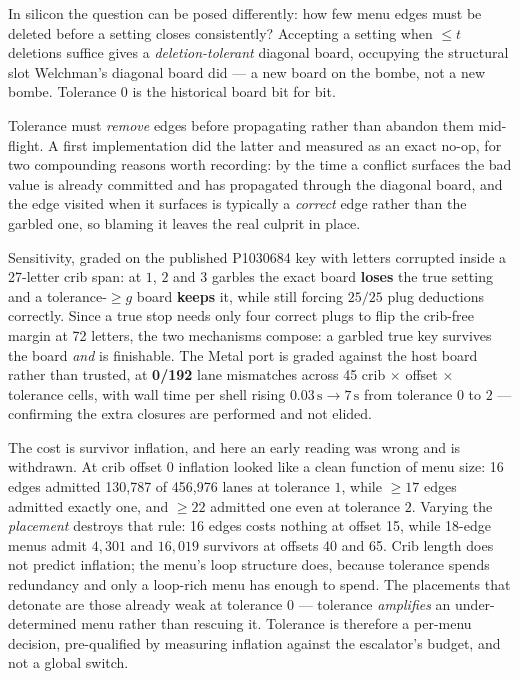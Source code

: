 \documentclass[11pt,a4paper]{article}
\begin{document}
In silicon the question can be posed differently: how few menu edges must be deleted
before a setting closes consistently? Accepting a setting when $\le t$ deletions
suffice gives a \emph{deletion-tolerant} diagonal board, occupying the structural slot
Welchman's diagonal board did --- a new board on the bombe, not a new bombe.
Tolerance $0$ is the historical board bit for bit.

Tolerance must \emph{remove} edges before propagating rather than abandon them
mid-flight. A first implementation did the latter and measured as an exact no-op, for
two compounding reasons worth recording: by the time a conflict surfaces the bad value
is already committed and has propagated through the diagonal board, and the edge
visited when it surfaces is typically a \emph{correct} edge rather than the garbled
one, so blaming it leaves the real culprit in place.

Sensitivity, graded on the published P1030684 key with letters corrupted inside a
27-letter crib span: at $1$, $2$ and $3$ garbles the exact board \textbf{loses} the
true setting and a tolerance-$\ge g$ board \textbf{keeps} it, while still forcing
$25/25$ plug deductions correctly.
Since a true stop needs only four correct plugs to flip the crib-free margin at 72
letters, the two mechanisms compose: a garbled true key survives the board
\emph{and} is finishable.
The Metal port is graded against the host board rather than trusted, at
\textbf{0/192} lane mismatches across 45 crib $\times$ offset $\times$ tolerance
cells, with wall time per shell rising $0.03\,\mathrm{s} \to 7\,\mathrm{s}$ from
tolerance $0$ to $2$ --- confirming the extra closures are performed and not elided.

The cost is survivor inflation, and here an early reading was wrong and is withdrawn.
At crib offset $0$ inflation looked like a clean function of menu size: 16 edges
admitted 130{,}787 of 456{,}976 lanes at tolerance $1$, while $\ge17$ edges admitted
exactly one, and $\ge22$ admitted one even at tolerance $2$.
Varying the \emph{placement} destroys that rule: 16 edges costs nothing at offset 15,
while 18-edge menus admit $4{,}301$ and $16{,}019$ survivors at offsets 40 and 65.
Crib length does not predict inflation; the menu's loop structure does, because
tolerance spends redundancy and only a loop-rich menu has enough to spend.
The placements that detonate are those already weak at tolerance $0$ --- tolerance
\emph{amplifies} an under-determined menu rather than rescuing it.
Tolerance is therefore a per-menu decision, pre-qualified by measuring inflation
against the escalator's budget, and not a global switch.
\end{document}

